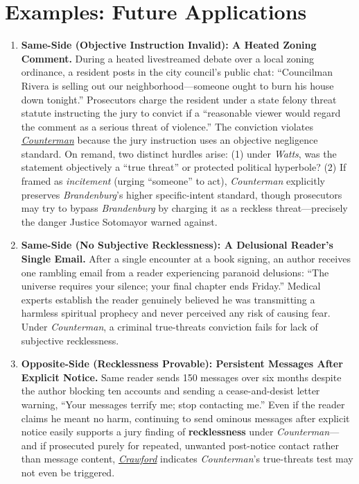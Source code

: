 \documentclass[12pt]{article}
\begin{document}
\section{Examples: Future Applications}
\begin{enumerate}

\item \textbf{Same-Side (Objective Instruction Invalid): A Heated Zoning Comment.} During a heated livestreamed debate over a local zoning ordinance, a resident posts in the city council's public chat: ``Councilman Rivera is selling out our neighborhood---someone ought to burn his house down tonight.'' Prosecutors charge the resident under a state felony threat statute instructing the jury to convict if a ``reasonable viewer would regard the comment as a serious threat of violence.'' The conviction violates \href{https://supreme.justia.com/cases/federal/us/600/22-138/}{\textit{Counterman}} because the jury instruction uses an objective negligence standard. On remand, two distinct hurdles arise: (1) under \textit{Watts}, was the statement objectively a ``true threat'' or protected political hyperbole? (2) If framed as \textit{incitement} (urging ``someone'' to act), \textit{Counterman} explicitly preserves \textit{Brandenburg}'s higher specific-intent standard, though prosecutors may try to bypass \textit{Brandenburg} by charging it as a reckless threat---precisely the danger Justice Sotomayor warned against.

\item \textbf{Same-Side (No Subjective Recklessness): A Delusional Reader's Single Email.} After a single encounter at a book signing, an author receives one rambling email from a reader experiencing paranoid delusions: ``The universe requires your silence; your final chapter ends Friday.'' Medical experts establish the reader genuinely believed he was transmitting a harmless spiritual prophecy and never perceived any risk of causing fear. Under \textit{Counterman}, a criminal true-threats conviction fails for lack of subjective recklessness.

\item \textbf{Opposite-Side (Recklessness Provable): Persistent Messages After Explicit Notice.} Same reader sends 150 messages over six months despite the author blocking ten accounts and sending a cease-and-desist letter warning, ``Your messages terrify me; stop contacting me.'' Even if the reader claims he meant no harm, continuing to send ominous messages after explicit notice easily supports a jury finding of \textbf{recklessness} under \textit{Counterman}---and if prosecuted purely for repeated, unwanted post-notice contact rather than message content, \href{https://law.justia.com/cases/colorado/supreme-court/2025/24sa226.html}{\textit{Crawford}} indicates \textit{Counterman}'s true-threats test may not even be triggered.


\end{enumerate}
\end{document}
